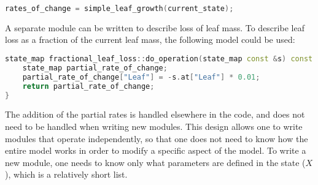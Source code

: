 \documentclass{article}
\begin{document}
\begin{center}
\begin{lstlisting}[language=c++]
rates_of_change = simple_leaf_growth(current_state);  
\end{lstlisting}
\end{center}

A separate module can be written to describe loss of leaf mass. To describe leaf loss as a fraction of the current leaf mass, the following model could be used:

\begin{center}
\begin{lstlisting}[language=c++]
state_map fractional_leaf_loss::do_operation(state_map const &s) const
    state_map partial_rate_of_change;
    partial_rate_of_change["Leaf"] = -s.at["Leaf"] * 0.01;
    return partial_rate_of_change;    
}
\end{lstlisting}
\end{center}

The addition of the partial rates is handled elsewhere in the code, and does not need to be handled when writing new modules. This design allows one to write modules that operate independently, so that one does not need to know how the entire model works in order to modify a specific aspect of the model. To write a new module, one needs to know only what parameters are defined in the state ($X$), which is a relatively short list.
\end{document}
